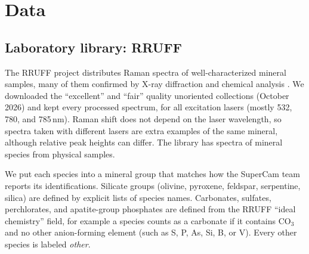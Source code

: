 \section{Data}
\label{sec:data}

\subsection{Laboratory library: RRUFF}
The RRUFF project distributes Raman spectra of well-characterized mineral samples, many of them confirmed by X-ray diffraction and chemical analysis \citep{lafuente2015rruff}. We downloaded the ``excellent'' and ``fair'' quality unoriented collections (October 2026) and kept every processed spectrum, for all excitation lasers (mostly 532, 780, and 785\,nm). Raman shift does not depend on the laser wavelength, so spectra taken with different lasers are extra examples of the same mineral, although relative peak heights can differ. The library has \nLabSpectra{} spectra of \nSpecies{} mineral species from \nSamples{} physical samples.

We put each species into a mineral group that matches how the SuperCam team reports its identifications. Silicate groups (olivine, pyroxene, feldspar, serpentine, silica) are defined by explicit lists of species names. Carbonates, sulfates, perchlorates, and apatite-group phosphates are defined from the RRUFF ``ideal chemistry'' field, for example a species counts as a carbonate if it contains CO$_3$ and no other anion-forming element (such as S, P, As, Si, B, or V). Every other species is labeled \emph{other}.

